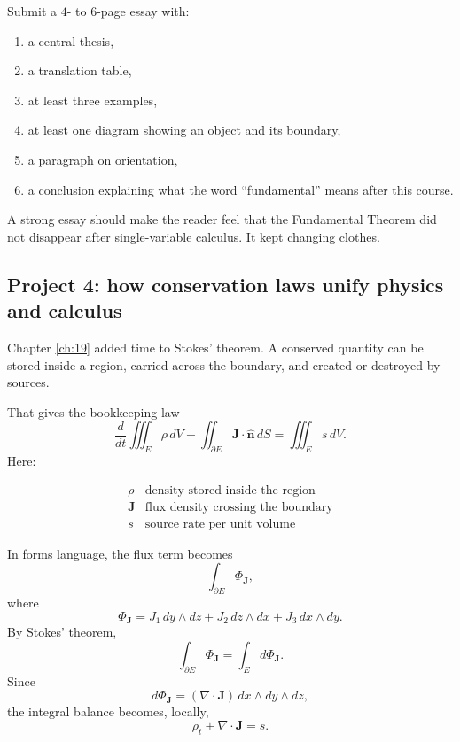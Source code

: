 Submit a \(4\)- to \(6\)-page essay with:

\begin{enumerate}
\item a central thesis,

\item a translation table,

\item at least three examples,

\item at least one diagram showing an object and its boundary,

\item a paragraph on orientation,

\item a conclusion explaining what the word ``fundamental'' means after this course.
\end{enumerate}

A strong essay should make the reader feel that the Fundamental Theorem did not
disappear after single-variable calculus.  It kept changing clothes.

\subsection{Project 4: how conservation laws unify physics and calculus}

Chapter \ref{ch:19} added time to Stokes' theorem.  A conserved quantity can be stored
inside a region, carried across the boundary, and created or destroyed by sources.

That gives the bookkeeping law
\[
\boxed{
    \frac{d}{dt}\iiint_E \rho\,dV
    +
    \iint_{\partial E}\mathbf J\cdot\widehat{\mathbf n}\,dS
    =
    \iiint_E s\,dV.
}
\]
Here:

\[
\begin{array}{c|c}
\rho & \text{density stored inside the region}\\[1mm]
\mathbf J & \text{flux density crossing the boundary}\\[1mm]
s & \text{source rate per unit volume}
\end{array}
\]

In forms language, the flux term becomes
\[
    \int_{\partial E}\Phi_{\mathbf J},
\]
where
\[
    \Phi_{\mathbf J}
    =
    J_1\,dy\wedge dz
    +
    J_2\,dz\wedge dx
    +
    J_3\,dx\wedge dy.
\]
By Stokes' theorem,
\[
    \int_{\partial E}\Phi_{\mathbf J}
    =
    \int_E d\Phi_{\mathbf J}.
\]
Since
\[
    d\Phi_{\mathbf J}
    =
    (\nabla\cdot\mathbf J)\,dx\wedge dy\wedge dz,
\]
the integral balance becomes, locally,
\[
\boxed{
    \rho_t+\nabla\cdot\mathbf J=s.
}
\]

